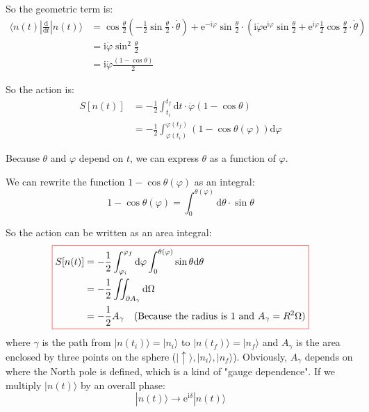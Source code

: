 So the geometric term is:
\begin{equation}
\begin{aligned}
\langle n(t)| \frac{\mathrm{d}}{\mathrm{d}t} |n(t)\rangle &= \cos\frac{\theta}{2} (-\frac{1}{2}\sin\frac{\theta}{2}\cdot\dot{\theta}) + \mathrm{e}^{-\mathrm{i}\varphi} \sin\frac{\theta}{2} \cdot (\mathrm{i}\dot{\varphi}\mathrm{e}^{\mathrm{i}\varphi}\sin\frac{\theta}{2} + \mathrm{e}^{\mathrm{i}\varphi}\frac{1}{2}\cos\frac{\theta}{2}\cdot\dot{\theta}) \\
&= \mathrm{i} \dot{\varphi} \sin^2\frac{\theta}{2} \\
&= \mathrm{i} \dot{\varphi} \frac{(1-\cos\theta)}{2}
\end{aligned}
\end{equation}

So the action is:
\begin{equation}
\begin{aligned}
S[n(t)] &= -\frac{1}{2} \int_{t_i}^{t_f} \mathrm{d}t \cdot \dot{\varphi} (1-\cos\theta) \\
&= -\frac{1}{2} \int_{\varphi(t_i)}^{\varphi(t_f)} (1-\cos\theta(\varphi)) \mathrm{d}\varphi
\end{aligned}
\end{equation}

Because $\theta$ and $\varphi$ depend on $t$, we can express $\theta$ as a function of $\varphi$.

We can rewrite the function $1-\cos\theta(\varphi)$ as an integral:
\begin{equation}
1-\cos\theta(\varphi) = \int_0^{\theta(\varphi)} \mathrm{d}\theta \cdot \sin\theta
\end{equation}

So the action can be written as an area integral:
\begin{equation}
    \colorboxed{
    \begin{aligned}
    S[n(t)] &= -\frac{1}{2} \int_{\varphi_i}^{\varphi_f} \mathrm{d}\varphi \int_0^{\theta(\varphi)} \sin\theta \mathrm{d}\theta \\
    &= -\frac{1}{2} \iint_{\partial A_{\gamma}} \mathrm{d}\Omega \\
    &= -\frac{1}{2} A_{\gamma} \quad (\text{Because the radius is } 1 \text{ and } A_{\gamma} = R^2 \Omega)
    \end{aligned}
    }
\end{equation}
where $\gamma$ is the path from $|n(t_i)\rangle=|n_i\rangle$ to $|n(t_f)\rangle=|n_f\rangle$
and $A_{\gamma}$ is the area enclosed by three points on the sphere ($|\uparrow\rangle, |n_i\rangle, |n_f\rangle$). Obviously, $A_{\gamma}$ depends on where the North pole is defined, which is a kind of "gauge dependence".
If we multiply $|n(t)\rangle$ by an overall phase:
\begin{equation}
|n(t)\rangle \longrightarrow \mathrm{e}^{\mathrm{i}\delta} |n(t)\rangle
\end{equation}


